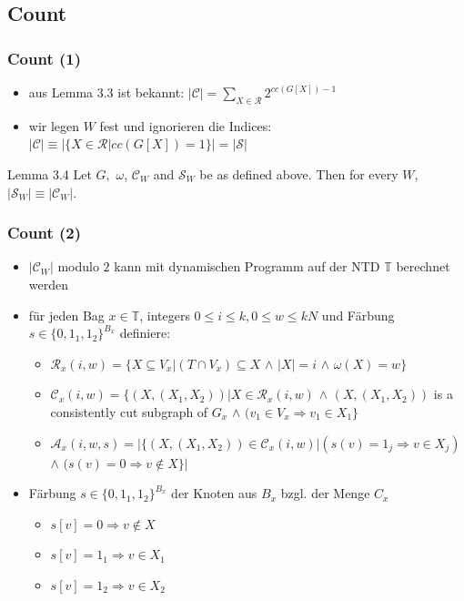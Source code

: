 \documentclass{beamer}
\begin{document}
\subsection{Count}
\begin{frame}
\frametitle{Count (1)}
\begin{itemize}
\pause
\item aus Lemma 3.3 ist bekannt: $|\mathcal{C}|=\sum_{X \in \mathcal{R}} 2^{cc(G[X])-1}$
\pause
\item wir legen $W$ fest und ignorieren die Indices: $|\mathcal{C}| \equiv |\{X \in \mathcal{R} |cc(G[X]) = 1\}| = |\mathcal{S}|$
\end{itemize}
\pause
\begin{block}{Lemma 3.4}
Let $G,$ $\omega$, $\mathcal{C}_W$ and $\mathcal{S}_W$ be as defined above. Then for every $W$, $|\mathcal{S}_W| \equiv |\mathcal{C}_W|$.
\end{block}
\end{frame}
\begin{frame}
\frametitle{Count (2)}
\begin{itemize}
\pause
\item $|\mathcal{C}_W|$ modulo $2$ kann mit dynamischen Programm auf der NTD $\mathbb{T}$ berechnet werden
\pause
\item für jeden Bag $x \in \mathbb{T}$, integers $0 \leq i \leq k,0 \leq w \leq kN$ und Färbung $s \in \{0,1_1,1_2 \}^{B_x}$ definiere:
\begin{itemize}
\pause
\item $\mathcal{R}_x(i,w)=\{X \subseteq V_x | (T \cap V_x) \subseteq X$ $\wedge$ $|X| = i$ $\wedge$ $\omega (X) = w \}$
\pause
\item $\mathcal{C}_x (i,w) =\{ (X,(X_1,X_2)) | X \in \mathcal{R}_x(i,w)$ $\wedge$ $(X,(X_1,X_2))$ is a consistently cut subgraph of $G_x$ $\wedge$ $(v_1 \in V_x \Rightarrow v_1 \in X_1 \} $
\pause
\item $\mathcal{A}_x(i,w,s)=| \{ (X,(X_1,X_2)) \in \mathcal{C}_x(i,w) | (s(v) = 1_j \Rightarrow v \in X_j)$ $\wedge$ $(s(v)=0 \Rightarrow v \notin X \} |$

\end{itemize}
\pause
\item Färbung $s \in \{0,1_1,1_2 \}^{B_x}$  der Knoten aus $B_x$ bzgl. der Menge $C_x$
\begin{itemize}
\item $s[v] = 0 \Rightarrow v \notin X$
\item $s[v] = 1_1 \Rightarrow v \in X_1$ 
\item $s[v] = 1_2 \Rightarrow v \in X_2$ 
\end{itemize}
\end{itemize}
\end{frame}
\end{document}
